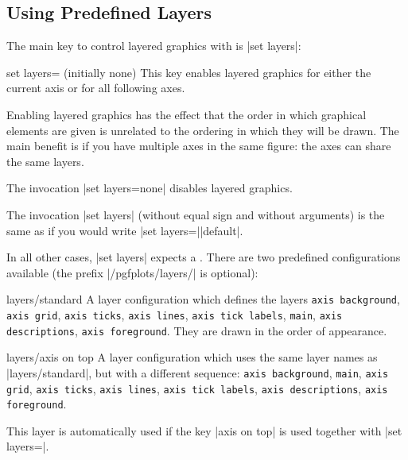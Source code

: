 {\subsection{Using Predefined Layers}

The main key to control layered graphics with \PGFPlots{} is |set layers|:


\begin{pgfplotskey}{set layers= (initially none)}
   This key enables layered graphics for either the current axis or for all
   following axes.

   Enabling layered graphics has the effect that the order in which graphical
   elements are given is unrelated to the ordering in which they will be drawn.
   The main benefit is if you have multiple axes in the same figure: the axes
   can share the same layers.

   The invocation |set layers=none| disables layered graphics.

   The invocation |set layers| (without equal sign and without arguments) is
   the same as if you would write |set layers=||default|.

   In all other cases, |set layers| expects a .
   There are two predefined configurations available (the prefix
   |/pgfplots/layers/| is optional):

   \begin{pgfplotskey}{layers/standard}
       A layer configuration which defines the layers \texttt{axis background},
       \texttt{axis grid}, \texttt{axis ticks}, \texttt{axis lines},
       \texttt{axis tick labels}, \texttt{main}, \texttt{axis descriptions},
       \texttt{axis foreground}. They are drawn in the order of appearance.
   \end{pgfplotskey}

   \begin{pgfplotskey}{layers/axis on top}
       A layer configuration which uses the same layer names as
       |layers/standard|, but with a different sequence: \texttt{axis
       background}, \texttt{main}, \texttt{axis grid}, \texttt{axis ticks},
       \texttt{axis lines}, \texttt{axis tick labels}, \texttt{axis
       descriptions}, \texttt{axis foreground}.

        This layer is automatically used if the key |axis on top| is used
        together with |set layers=|.
   \end{pgfplotskey}


\end{pgfplotskey}}
